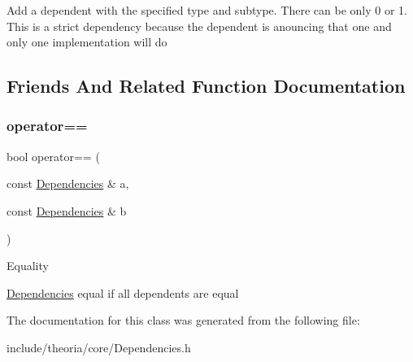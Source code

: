 Add a dependent with the specified type and subtype. There can be only 0 or 1. This is a strict dependency because the dependent is anouncing that one and only one implementation will do 

\subsection{Friends And Related Function Documentation}
\mbox{\label{classtheoria_1_1core_1_1Dependencies_a3fef4fe6d625d0698807b631fa90db4b}} 
\subsubsection{\texorpdfstring{operator==}{operator==}}
{\footnotesize\ttfamily bool operator== (\begin{DoxyParamCaption}\item[{const \hyperlink{classtheoria_1_1core_1_1Dependencies}{Dependencies} \&}]{a,  }\item[{const \hyperlink{classtheoria_1_1core_1_1Dependencies}{Dependencies} \&}]{b }\end{DoxyParamCaption})\hspace{0.3cm}{\ttfamily [friend]}}

Equality

\hyperlink{classtheoria_1_1core_1_1Dependencies}{Dependencies} equal if all dependents are equal 

The documentation for this class was generated from the following file\+:\begin{DoxyCompactItemize}
\item 
include/theoria/core/Dependencies.\+h\end{DoxyCompactItemize}
